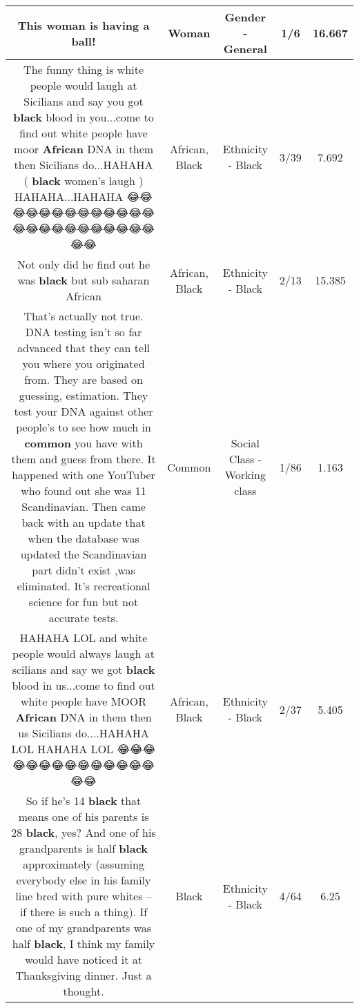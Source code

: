 \documentclass[11pt]{article}
\newlength\mylength
\begin{document}
\begin{center}
\begin{longtable}{|C{.65\mylength}|C{.30\mylength}|C{.12\mylength}|C{.12\mylength}|C{.12\mylength}|}
  \small This \textbf{woman} is having a ball!\normalsize   & Woman & Gender - General & 1/6 & 16.667 \\  \hline
  \small The funny thing is white people would laugh at Sicilians and say you got \textbf{black} blood in you...come to find out white people have moor \textbf{African} DNA in them then Sicilians do...HAHAHA ( \textbf{black} women's laugh ) HAHAHA...HAHAHA 😂😂😂😂😂😂😂😂😂😂😂😂😂😂😂😂😂😂😂😂😂😂😂😂😂😂\normalsize   & African, Black & Ethnicity - Black & 3/39 & 7.692 \\  \hline
  \small Not only did he find out he was \textbf{black} but sub saharan African\normalsize   & African, Black & Ethnicity - Black & 2/13 & 15.385 \\  \hline
  \small That's actually not true. DNA testing isn't so far advanced that they can tell you where you originated from. They are based on guessing, estimation. They test your DNA against other people's to see how much in \textbf{common} you have with them and guess from there. It happened with one YouTuber who found out she was 11 Scandinavian. Then came back with an update that when the database was updated the Scandinavian part didn't exist ,was eliminated. It's recreational science for fun but not accurate tests.\normalsize   & Common & Social Class - Working class & 1/86 & 1.163 \\  \hline
  \small HAHAHA LOL and white people would always laugh at scilians and say we got \textbf{black} blood in us...come to find out white people have MOOR \textbf{African} DNA in them then us Sicilians do....HAHAHA LOL HAHAHA LOL 😂😂😂😂😂😂😂😂😂😂😂😂😂😂😂😂\normalsize   & African, Black & Ethnicity - Black & 2/37 & 5.405 \\  \hline
  \small So if he's 14 \textbf{black} that means one of his parents is 28 \textbf{black}, yes? And one of his grandparents is half \textbf{black} approximately (assuming everybody else in his family line bred with pure whites -- if there is such a thing). If one of my grandparents was half \textbf{black}, I think my family would have noticed it at Thanksgiving dinner. Just a thought.\normalsize   & Black & Ethnicity - Black & 4/64 & 6.25 \\  \hline

\end{longtable}
\end{center}
\end{document}
